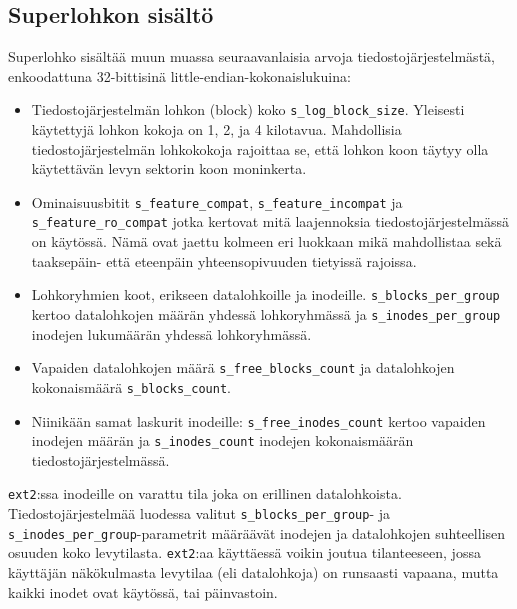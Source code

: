 \subsection{Superlohkon sisältö}
Superlohko sisältää muun muassa seuraavanlaisia arvoja tiedostojärjestelmästä, enkoodattuna 32-bittisinä little-endian-kokonaislukuina:
\begin{itemize}
    \item Tiedostojärjestelmän lohkon (block) koko \texttt{s\_log\_block\_size}. Yleisesti käytettyjä lohkon kokoja on 1, 2, ja 4 kilotavua.
          Mahdollisia tiedostojärjestelmän lohkokokoja rajoittaa se, että lohkon koon täytyy olla käytettävän levyn sektorin koon moninkerta.
    \item Ominaisuusbitit \texttt{s\_feature\_compat}, \texttt{s\_feature\_incompat} ja \texttt{s\_feature\_ro\_compat} jotka kertovat mitä laajennoksia tiedostojärjestelmässä on käytössä.
          Nämä ovat jaettu kolmeen eri luokkaan mikä mahdollistaa sekä taaksepäin- että eteenpäin yhteensopivuuden tietyissä rajoissa.
    \item Lohkoryhmien koot, erikseen datalohkoille ja inodeille.
          \texttt{s\_blocks\_per\_group} kertoo datalohkojen määrän yhdessä lohkoryhmässä ja \texttt{s\_inodes\_per\_group} inodejen lukumäärän yhdessä lohkoryhmässä.
    \item Vapaiden datalohkojen määrä \texttt{s\_free\_blocks\_count} ja datalohkojen kokonaismäärä \texttt{s\_blocks\_count}.
    \item Niinikään samat laskurit inodeille: \texttt{s\_free\_inodes\_count} kertoo vapaiden inodejen määrän ja \texttt{s\_inodes\_count} inodejen kokonaismäärän tiedostojärjestelmässä.
\end{itemize}

\texttt{ext2}:ssa inodeille on varattu tila joka on erillinen datalohkoista.
Tiedostojärjestelmää luodessa valitut \texttt{s\_blocks\_per\_group}- ja \texttt{s\_inodes\_per\_group}-parametrit määräävät inodejen ja datalohkojen suhteellisen osuuden koko levytilasta.
\texttt{ext2}:aa käyttäessä voikin joutua tilanteeseen, jossa käyttäjän näkökulmasta levytilaa (eli datalohkoja) on runsaasti vapaana, mutta kaikki inodet ovat käytössä, tai päinvastoin.

